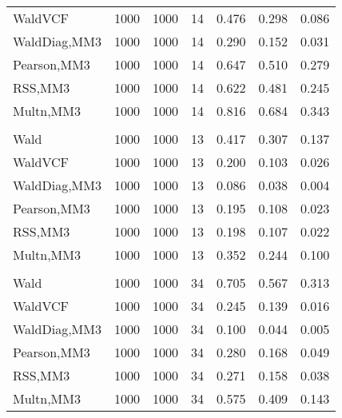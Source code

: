 \documentclass[
]{article}
\begin{document}
\begin{table}[H]
{\begin{tabular}[t]{lrrrrrr}
\hspace{1em}WaldVCF & 1000 & 1000 & 14 & 0.476 & 0.298 & 0.086\\
\hspace{1em}WaldDiag,MM3 & 1000 & 1000 & 14 & 0.290 & 0.152 & 0.031\\
\hspace{1em}Pearson,MM3 & 1000 & 1000 & 14 & 0.647 & 0.510 & 0.279\\
\hspace{1em}RSS,MM3 & 1000 & 1000 & 14 & 0.622 & 0.481 & 0.245\\
\hspace{1em}Multn,MM3 & 1000 & 1000 & 14 & 0.816 & 0.684 & 0.343\\
\addlinespace[0.3em]
\multicolumn{7}{l}{\textbf{2F 10V}}\\
\hspace{1em}Wald & 1000 & 1000 & 13 & 0.417 & 0.307 & 0.137\\
\hspace{1em}WaldVCF & 1000 & 1000 & 13 & 0.200 & 0.103 & 0.026\\
\hspace{1em}WaldDiag,MM3 & 1000 & 1000 & 13 & 0.086 & 0.038 & 0.004\\
\hspace{1em}Pearson,MM3 & 1000 & 1000 & 13 & 0.195 & 0.108 & 0.023\\
\hspace{1em}RSS,MM3 & 1000 & 1000 & 13 & 0.198 & 0.107 & 0.022\\
\hspace{1em}Multn,MM3 & 1000 & 1000 & 13 & 0.352 & 0.244 & 0.100\\
\addlinespace[0.3em]
\multicolumn{7}{l}{\textbf{3F 15V}}\\
\hspace{1em}Wald & 1000 & 1000 & 34 & 0.705 & 0.567 & 0.313\\
\hspace{1em}WaldVCF & 1000 & 1000 & 34 & 0.245 & 0.139 & 0.016\\
\hspace{1em}WaldDiag,MM3 & 1000 & 1000 & 34 & 0.100 & 0.044 & 0.005\\
\hspace{1em}Pearson,MM3 & 1000 & 1000 & 34 & 0.280 & 0.168 & 0.049\\
\hspace{1em}RSS,MM3 & 1000 & 1000 & 34 & 0.271 & 0.158 & 0.038\\
\hspace{1em}Multn,MM3 & 1000 & 1000 & 34 & 0.575 & 0.409 & 0.143\\
\bottomrule
\end{tabular}}
\endgroup{}
\end{table}
\end{document}
